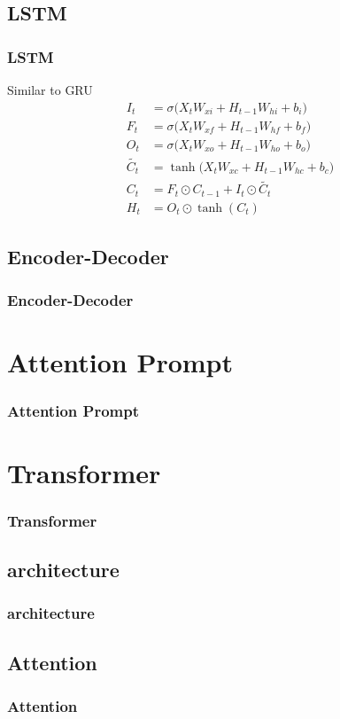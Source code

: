 \documentclass[]{beamer}
\begin{document}
\subsection{LSTM}
\begin{frame}
    \frametitle{LSTM}
    Similar to GRU
    \begin{align*}
        I_t &= \sigma\bigl(X_t W_{xi} + H_{t-1}W_{hi} + b_i\bigr) \\
        F_t &= \sigma\bigl(X_t W_{xf} + H_{t-1} W_{hf} + b_f\bigr) \\
        O_t &= \sigma\bigl(X_t W_{xo} + H_{t-1} W_{ho} + b_o\bigr) \\
        \tilde{C_t} &= \tanh \bigl(X_t W_{xc} + H_{t-1}W_{hc} + b_c\bigr) \\
        C_t &= F_t \odot C_{t-1} + I_t \odot \tilde{C_t} \\
        H_t &= O_t \odot \tanh(C_t)
    \end{align*}
\end{frame}

\subsection{Encoder-Decoder}
\begin{frame}
    \frametitle{Encoder-Decoder}
\end{frame}

\section{Attention Prompt}
\begin{frame}
    \frametitle{Attention Prompt}
\end{frame}


\section{Transformer}
\begin{frame}
    \frametitle{Transformer}
\end{frame}

\subsection{architecture}
\begin{frame}
    \frametitle{architecture}
\end{frame}

\subsection{Attention}
\begin{frame}
    \frametitle{Attention}
\end{frame}
\end{document}

